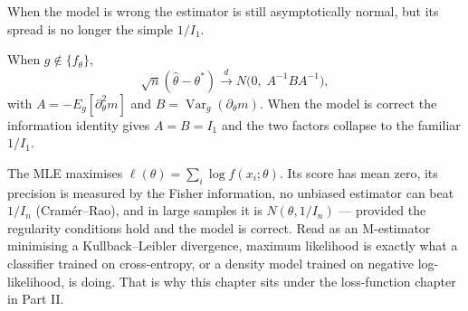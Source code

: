 \documentclass[11pt]{article}
\begin{document}
When the model is wrong the estimator is still asymptotically normal, but
its spread is no longer the simple $1/I_1$.

\begin{theorem}
When $g\notin\{f_\theta\}$,
\[
  \sqrt n(\hat\theta-\theta^\ast)\xrightarrow{d} N\!\big(0,\;A^{-1}BA^{-1}\big),
\]
with $A = -E_g[\partial_\theta^2 m]$ and
$B = \operatorname{Var}_g(\partial_\theta m)$. When the model is correct the
information identity gives $A=B=I_1$ and the two factors collapse to the
familiar $1/I_1$.
\end{theorem}

\begin{summarybox}
The MLE maximises $\ell(\theta)=\sum_i\log f(x_i;\theta)$. Its score has
mean zero, its precision is measured by the Fisher information, no unbiased
estimator can beat $1/I_n$ (Cram\'er--Rao), and in large samples it is
$N(\theta, 1/I_n)$ --- provided the regularity conditions hold and the model
is correct. Read as an M-estimator minimising a Kullback--Leibler
divergence, maximum likelihood is exactly what a classifier trained on
cross-entropy, or a density model trained on negative log-likelihood, is
doing. That is why this chapter sits under the loss-function chapter in
Part II.
\end{summarybox}
\end{document}
